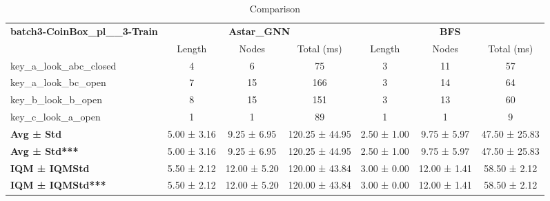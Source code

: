 \begin{table}[!ht]
\centering
\small
\begin{tabular}{l|ccc|ccc}
\multirow{2}{*}{\textbf{batch3-CoinBox\_pl\_\_3-Train}} & \multicolumn{3}{c|}{\textbf{Astar\_GNN}} & \multicolumn{3}{c}{\textbf{BFS}} \\
\cline{2-7}
& Length & Nodes & Total (ms) & Length & Nodes & Total (ms) \\
\hline
key\_a\_look\_abc\_closed & 4 & 6 & 75 & 3 & 11 & 57 \\
key\_a\_look\_bc\_open & 7 & 15 & 166 & 3 & 14 & 64 \\
key\_b\_look\_b\_open & 8 & 15 & 151 & 3 & 13 & 60 \\
key\_c\_look\_a\_open & 1 & 1 & 89 & 1 & 1 & 9 \\
\hline
\textbf{Avg ± Std} & 5.00 ± 3.16 & 9.25 ± 6.95 & 120.25 ± 44.95 & 2.50 ± 1.00 & 9.75 ± 5.97 & 47.50 ± 25.83 \\
\textbf{Avg ± Std***} & 5.00 ± 3.16 & 9.25 ± 6.95 & 120.25 ± 44.95 & 2.50 ± 1.00 & 9.75 ± 5.97 & 47.50 ± 25.83 \\
\textbf{IQM ± IQMStd} & 5.50 ± 2.12 & 12.00 ± 5.20 & 120.00 ± 43.84 & 3.00 ± 0.00 & 12.00 ± 1.41 & 58.50 ± 2.12 \\
\textbf{IQM ± IQMStd***} & 5.50 ± 2.12 & 12.00 ± 5.20 & 120.00 ± 43.84 & 3.00 ± 0.00 & 12.00 ± 1.41 & 58.50 ± 2.12 \\
\end{tabular}
\caption{Comparison}
\label{tab:batch3_CoinBox_pl__3_comparison_train}
\end{table}

